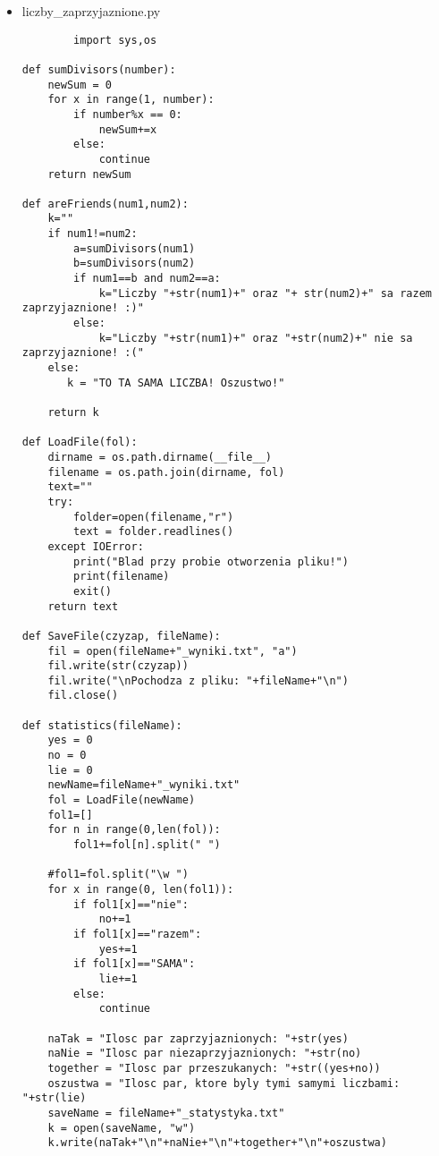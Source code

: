 \documentclass[12pt,a4paper]{article}
\begin{document}
\begin{itemize}
\begin{lstlisting}
cd..
mkdir "backup\%name%"
xcopy Projekt backup\%name% /E /I /H /Y

cls
echo  +++++++++++++++++++++++++++++++++++++++++++++++++
echo                        BACKUP                      
echo  +++++++++++++++++++++++++++++++++++++++++++++++++
echo.
echo.
echo   Backup zostal wykonany z data %name%
echo.
echo.
echo  +++++++++++++++++++++++++++++++++++++++++++++++++
echo.
set /p wybor="Aby wrocic do MENU nacisnij ENTER..."
goto MENU

       \end{lstlisting}
       \item liczby\_zaprzyjaznione.py
	\begin{lstlisting}
	    import sys,os

def sumDivisors(number):
    newSum = 0
    for x in range(1, number):
        if number%x == 0:
            newSum+=x
        else:
            continue
    return newSum

def areFriends(num1,num2):
    k=""
    if num1!=num2:
        a=sumDivisors(num1)
        b=sumDivisors(num2)
        if num1==b and num2==a:
            k="Liczby "+str(num1)+" oraz "+ str(num2)+" sa razem zaprzyjaznione! :)"
        else:
            k="Liczby "+str(num1)+" oraz "+str(num2)+" nie sa zaprzyjaznione! :("
    else:
       k = "TO TA SAMA LICZBA! Oszustwo!"
    
    return k

def LoadFile(fol):
    dirname = os.path.dirname(__file__)
    filename = os.path.join(dirname, fol)
    text=""
    try:
        folder=open(filename,"r")
        text = folder.readlines()    
    except IOError:
        print("Blad przy probie otworzenia pliku!")
        print(filename)
        exit() 
    return text

def SaveFile(czyzap, fileName):
    fil = open(fileName+"_wyniki.txt", "a")
    fil.write(str(czyzap))
    fil.write("\nPochodza z pliku: "+fileName+"\n")
    fil.close()

def statistics(fileName):
    yes = 0
    no = 0
    lie = 0
    newName=fileName+"_wyniki.txt"
    fol = LoadFile(newName)
    fol1=[]
    for n in range(0,len(fol)):
        fol1+=fol[n].split(" ")

    #fol1=fol.split("\w ")
    for x in range(0, len(fol1)):
        if fol1[x]=="nie":
            no+=1
        if fol1[x]=="razem":
            yes+=1
        if fol1[x]=="SAMA":
            lie+=1
        else:
            continue
    
    naTak = "Ilosc par zaprzyjaznionych: "+str(yes)
    naNie = "Ilosc par niezaprzyjaznionych: "+str(no)
    together = "Ilosc par przeszukanych: "+str((yes+no))
    oszustwa = "Ilosc par, ktore byly tymi samymi liczbami: "+str(lie)
    saveName = fileName+"_statystyka.txt"
    k = open(saveName, "w")
    k.write(naTak+"\n"+naNie+"\n"+together+"\n"+oszustwa)



\end{lstlisting}
\end{itemize}
\end{document}
